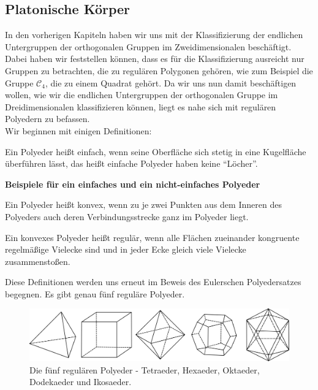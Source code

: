 \subsection{Platonische Körper}
In den vorherigen Kapiteln haben wir uns mit der Klassifizierung der endlichen Untergruppen der orthogonalen Gruppen im Zweidimensionalen beschäftigt. Dabei haben wir feststellen können, dass es für die Klassifizierung ausreicht nur Gruppen zu betrachten, die zu regulären Polygonen gehören, wie zum Beispiel die Gruppe $\mathcal{C}_4$, die zu einem Quadrat gehört. Da wir uns nun damit beschäftigen wollen, wie wir die endlichen Untergruppen der orthogonalen Gruppe im Dreidimensionalen klassifizieren können, liegt es nahe sich mit regulären Polyedern zu befassen.\\
Wir beginnen mit einigen Definitionen: 
\begin{defi}
	Ein Polyeder heißt einfach, wenn seine Oberfläche sich stetig in eine Kugelfläche überführen lässt, das heißt einfache Polyeder haben keine \enquote{Löcher}. \citep[211]{Mainzer1988}
\end{defi}
\textbf{Beispiele für ein einfaches und ein nicht-einfaches Polyeder}
\begin{defi}
	Ein Polyeder heißt konvex, wenn zu je zwei Punkten aus dem Inneren des Polyeders auch deren Verbindungsstrecke ganz im Polyeder liegt. \citep[51]{Mueller2012}
\end{defi}
\begin{defi}
	Ein konvexes Polyeder heißt regulär, wenn alle Flächen zueinander kongruente regelmäßige Vielecke sind und in jeder Ecke gleich viele Vielecke zusammenstoßen. \citep[51]{Mueller2012}
\end{defi}
Diese Definitionen werden uns erneut im Beweis des Eulerschen Polyedersatzes begegnen. Es gibt genau fünf reguläre Polyeder.\\
\begin{figure}[H]
    \centering
    \includegraphics[width=0.9\linewidth]{grafiken/platonische_koerper.pdf}
    \caption{Die fünf regulären Polyeder - Tetraeder, Hexaeder, Oktaeder, Dodekaeder und Ikosaeder.}
    \label{fig:grafiken/platonische_koerper}
\end{figure}
